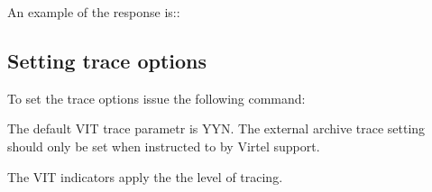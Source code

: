 \documentclass[letterpaper,10pt,english]{sphinxmanual}
\begin{document}
\sphinxAtStartPar
An example of the response is:\sphinxhyphen{}:

\begin{sphinxVerbatim}[commandchars=\\\{\}]
    
 
         
   
\end{sphinxVerbatim}

\newpage

\ignorespaces 

\subsection{Setting trace options}
\label{\detokenize{audit_operations_ and_performance:setting-trace-options}}\label{\detokenize{audit_operations_ and_performance:index-30}}
\sphinxAtStartPar
To set the trace options issue the following command:

\begin{sphinxVerbatim}[commandchars=\\\{\}]
  
\end{sphinxVerbatim}

\sphinxAtStartPar
The default VIT trace parametr is YYN. The external archive trace setting should only be set when instructed to by Virtel support.

\sphinxAtStartPar
The VIT indicators apply the the level of tracing.

\begin{sphinxVerbatim}[commandchars=\\\{\}]
                
              
              
\end{sphinxVerbatim}
\end{document}
